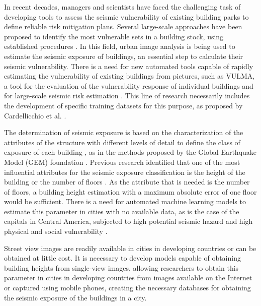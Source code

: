 \documentclass[journal,article,submit,pdftex,moreauthors]{Definitions/mdpi}
\begin{document}
In recent decades, managers and scientists have faced the challenging task of developing tools to assess the seismic vulnerability of existing building parks to define reliable risk mitigation plans. Several large-scale approaches have been proposed to identify the most vulnerable sets in a building stock, using established procedures \citep{BaggioFieldGORETTI,BrzevGEMModelling}. In this field, urban image analysis is being used to estimate the seismic exposure of buildings, an essential step to calculate their seismic vulnerability. There is a need for new automated tools capable of rapidly estimating the vulnerability of existing buildings from pictures, such as VULMA, a tool for the evaluation of the vulnerability response of individual buildings and for large-scale seismic risk estimation \cite{Ruggieri2021Machine-learningBuildings}. This line of research necessarily includes the development of specific training datasets for this purpose, as proposed by Cardellicchio et al.  \cite{Cardellicchio2022ViewBuildings}.

The determination of seismic exposure is based on the characterization of the attributes of the structure with different levels of detail to define the class of exposure of each building \cite{Esquivel-Salas2022RemoteRica}, as in the methods proposed by the Global Earthquake Model (GEM) foundation \cite{BrzevGEMModelling}. Previous research identified that one of the most influential attributes for the seismic exposure classification is the height of the building or the number of floors \citep{Esquivel-Salas2022RemoteRica,Rodriguez-Saiz2022ExposicionGeoespaciales}. As the attribute that is needed is the number of floors, a building height estimation with a maximum absolute error of one floor would be sufficient. There is a need for automated machine learning models to estimate this parameter in cities with no available data, as is the case of the capitals in Central America, subjected to high potential seismic hazard and  high physical and social vulnerability \cite{Benito2012ARegion}. 

Street view images are readily available in cities in developing countries or can be obtained at little cost. It is necessary to develop models capable of obtaining building heights from single-view images, allowing researchers to obtain this parameter in cities in developing countries from images available on the Internet or captured using mobile phones, creating the necessary databases for obtaining the seismic exposure of the buildings in a city. 
\end{document}
